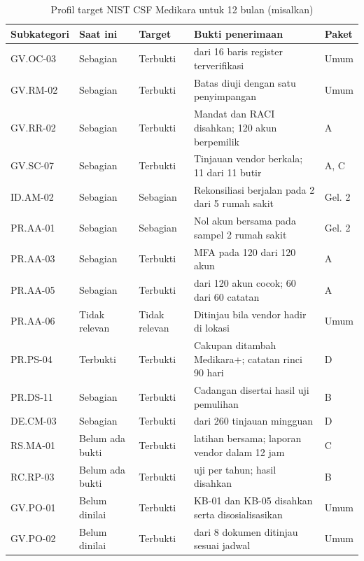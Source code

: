 \begin{table}[!htb]
  \centering\footnotesize
  \caption{Profil target NIST CSF Medikara untuk 12 bulan (misalkan)}
  \label{tab:ch08-profil-target}
  \begin{tabularx}{\textwidth}{|>{\raggedright\arraybackslash}p{}|>{\raggedright\arraybackslash}p{}|>{\raggedright\arraybackslash}p{}|>{\raggedright\arraybackslash}X|>{\raggedright\arraybackslash}p{}|}
    \hline
    \textbf{Subkategori} & \textbf{Saat ini} & \textbf{Target} & \textbf{Bukti penerimaan} &
    \textbf{Paket} \\ \hline
    GV.OC-03 & Sebagian & Terbukti & 16 dari 16 baris register terverifikasi & Umum \\ \hline
    GV.RM-02 & Sebagian & Terbukti & Batas diuji dengan satu penyimpangan & Umum \\ \hline
    GV.RR-02 & Sebagian & Terbukti & Mandat dan RACI disahkan; 120 akun berpemilik & A \\ \hline
    GV.SC-07 & Sebagian & Terbukti & Tinjauan vendor berkala; 11 dari 11 butir & A, C \\ \hline
    ID.AM-02 & Sebagian & Sebagian & Rekonsiliasi berjalan pada 2 dari 5 rumah sakit & Gel. 2 \\
    \hline
    PR.AA-01 & Sebagian & Sebagian & Nol akun bersama pada sampel 2 rumah sakit & Gel. 2 \\
    \hline
    PR.AA-03 & Sebagian & Terbukti & MFA pada 120 dari 120 akun & A \\ \hline
    PR.AA-05 & Sebagian & Terbukti & 120 dari 120 akun cocok; 60 dari 60 catatan & A \\ \hline
    PR.AA-06 & Tidak relevan & Tidak relevan & Ditinjau bila vendor hadir di lokasi & Umum \\
    \hline
    PR.PS-04 & Terbukti & Terbukti & Cakupan ditambah Medikara+; catatan rinci 90 hari & D \\
    \hline
    PR.DS-11 & Sebagian & Terbukti & Cadangan disertai hasil uji pemulihan & B \\ \hline
    DE.CM-03 & Sebagian & Terbukti & 247 dari 260 tinjauan mingguan & D \\ \hline
    RS.MA-01 & Belum ada bukti & Terbukti & 2 latihan bersama; laporan vendor dalam 12 jam & C \\
    \hline
    RC.RP-03 & Belum ada bukti & Terbukti & 144 uji per tahun; hasil disahkan & B \\ \hline
    GV.PO-01 & Belum dinilai & Terbukti & KB-01 dan KB-05 disahkan serta disosialisasikan & Umum
    \\ \hline
    GV.PO-02 & Belum dinilai & Terbukti & 8 dari 8 dokumen ditinjau sesuai jadwal & Umum \\
    \hline
  \end{tabularx}
\end{table}

